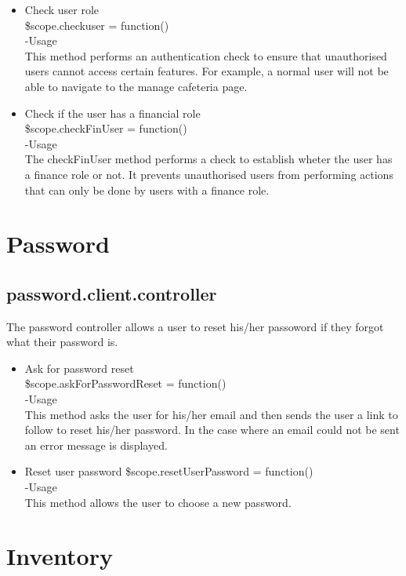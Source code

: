 \documentclass[a4paper,12pt]{article}
\begin{document}
\begin{itemize}
\item Check user role\\
 \$scope.checkuser = function()\\
-Usage\\
This method performs an authentication check to ensure that unauthorised users cannot access certain features. For example, a normal user will not be able to navigate to the manage cafeteria page.

\item Check if the user has a financial role\\
 \$scope.checkFinUser = function()\\
-Usage\\
The checkFinUser method performs a check to establish wheter the user has a finance role or not. It prevents unauthorised users from performing actions that can only be done by users with a finance role.
 \end{itemize}
 \section{Password}
 \subsection{password.client.controller}
 The password controller allows a user to reset his/her passoword if they forgot what their password is. 
 \begin{itemize}
\item Ask for password reset\\
  \$scope.askForPasswordReset = function()\\
 -Usage\\
 This method asks the user for his/her email and then sends the user a link to follow to reset his/her password. In the case where an email could not be sent an error message is displayed.
 \item Reset user password
  \$scope.resetUserPassword = function()\\
 -Usage\\
 This method allows the user to choose a new password.
 \end{itemize}
 \section{Inventory}
\end{document}
